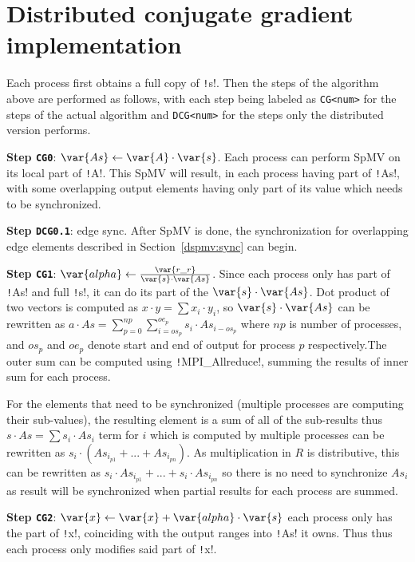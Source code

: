 \documentclass[thesis=M,english]{FITthesis}[2019/12/23]
\newcommand{\csre}[1]{\texttt!#1!}
\begin{document}
\section{Distributed conjugate gradient implementation}\label{dcg:steps}

Each process first obtains a full copy of \csre{s}.
Then the steps of the algorithm above are performed as follows, with each step being labeled as
\texttt{CG<num>} for the steps of the actual algorithm and \texttt{DCG<num>} for the steps
only the distributed version performs.

\textbf{Step \texttt{CG0}}: $\var{As} \gets \var{A} \cdot \var{s}$. Each process can perform SpMV on its local part of
\csre{A}. This SpMV will result, in each process having part of \csre{As}, with some overlapping
output elements having only part of its value which needs to be synchronized.

\textbf{Step \texttt{DCG0.1}}: edge sync. After SpMV is done, the synchronization for overlapping
edge elements described in Section~\ref{dspmv:sync} can begin.

\textbf{Step \texttt{CG1}}: $\var{alpha} \gets \frac{\var{r\_r}}{\var{s} \cdot \var{As}}$. Since each process only has part of
\csre{As} and full \csre{s}, it can do its part of the $\var{s} \cdot \var{As}$.
Dot product of two vectors is computed as $x \cdot y = \sum x_i \cdot y_i$, so $\var{s} \cdot \var{As}$
can be rewritten as $a \cdot As = \sum_{p=0}^{np} \sum_{i=os_p}^{oe_p} s_i \cdot As_{i-os_p}$ where
$np$ is number of processes, and $os_p$ and $oe_p$ denote start and end of output for process
$p$ respectively.The outer sum can be computed using \csre{MPI_Allreduce},
summing the results of inner sum for each process.

For the elements that need to be synchronized (multiple processes are computing their sub-values),
the resulting element is a sum of all of the sub-results thus $s \cdot As = \sum s_i \cdot As_i$ term for $i$
which is computed by multiple processes can be rewritten as $s_i \cdot (As_{i_{p1}} + ... + As_{i_{pn}})$.
As multiplication in $R$ is distributive, this can be rewritten as $s_i \cdot As_{i_{p1}} + ... + s_i \cdot As_{i_{pn}}$
so there is no need to synchronize $As_i$ as result will be synchronized when partial results for
each process are summed.

\textbf{Step \texttt{CG2}}: $\var{x} \gets \var{x} + \var{alpha} \cdot \var{s}$ each process only has the part of \csre{x},
coinciding with the output ranges into \csre{As} it owns. Thus thus each process only
modifies said part of \csre{x}.
\end{document}
